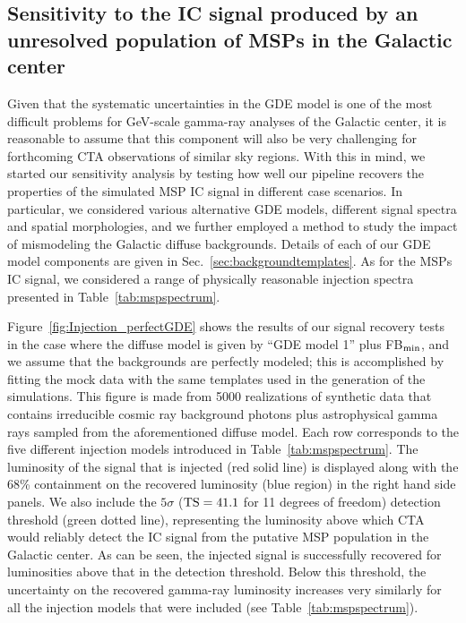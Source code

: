\documentclass[doublespace,nopageskip]{VTthesis} %
\begin{document}
\subsection{Sensitivity to the IC signal produced by an unresolved population of MSPs in the Galactic center}
\label{subsec:sensitivityICMSPs}

Given that the systematic uncertainties in the GDE model is one of the most difficult problems for GeV-scale gamma-ray analyses of the Galactic center, it is reasonable to assume that this component will also be very challenging for forthcoming CTA observations of similar sky regions. With this in mind, we started our sensitivity analysis by testing how well our pipeline recovers the properties of the simulated MSP IC signal in different case scenarios. In particular, we considered various alternative GDE models, different signal spectra and spatial morphologies, and we further employed a method to study the impact of mismodeling the Galactic diffuse backgrounds. Details of each of our GDE model components are given in Sec.~\ref{sec:backgroundtemplates}. As for the MSPs IC signal, we considered a range of physically reasonable injection spectra presented in Table~\ref{tab:mspspectrum}.

Figure~\ref{fig:Injection_perfectGDE} shows the results of our signal recovery tests in the case where the diffuse model is given by ``GDE model 1'' plus FB$_{\rm min}$, and we assume that the backgrounds are perfectly modeled; this is accomplished by fitting the mock data with the same templates used in the generation of the simulations. This figure is made from 5000 realizations of synthetic data that contains irreducible cosmic ray background photons plus astrophysical gamma rays sampled from the aforementioned diffuse model. Each row corresponds to the five different injection models introduced in Table~\ref{tab:mspspectrum}. The luminosity of the signal that is injected (red solid line) is displayed along with the 68\% containment on the recovered luminosity (blue region) in the right hand side panels. We also include the $5\sigma$ (${\rm TS}=41.1$ for 11 degrees of freedom) detection threshold (green dotted line), representing the luminosity above which CTA would reliably detect the IC signal from the putative MSP population in the Galactic center. As can be seen, the injected signal is successfully recovered for luminosities above that in the detection threshold. Below this threshold, the uncertainty on the recovered gamma-ray luminosity increases very similarly for all the injection models that were included (see Table~\ref{tab:mspspectrum}).
\end{document}
